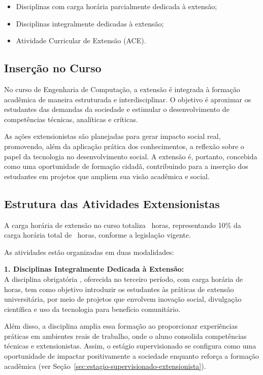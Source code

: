 \begin{itemize}
    \item Disciplinas com carga horária parcialmente dedicada à extensão;
    \item Disciplinas integralmente dedicadas à extensão;
    \item Atividade Curricular de Extensão (ACE).
\end{itemize}

\subsection{Inserção no Curso}

No curso de Engenharia de Computação, a extensão é integrada à formação acadêmica de maneira estruturada e interdisciplinar. O objetivo é aproximar os estudantes das demandas da sociedade e estimular o desenvolvimento de competências técnicas, analíticas e críticas.

As ações extensionistas são planejadas para gerar impacto social real, promovendo, além da aplicação prática dos conhecimentos, a reflexão sobre o papel da tecnologia no desenvolvimento social. A extensão é, portanto, concebida como uma oportunidade de formação cidadã, contribuindo para a inserção dos estudantes em projetos que ampliem sua visão acadêmica e social.

\subsection{Estrutura das Atividades Extensionistas}

A carga horária de extensão no curso totaliza \hExtensao\ horas, representando 10\% da carga horária total de \tHorasCurso\ horas, conforme a legislação vigente.

As atividades estão organizadas em duas modalidades:

\textbf{1. Disciplinas Integralmente Dedicada à Extensão:}\\
A disciplina obrigatória \textbf{\Ext}, oferecida no terceiro período, com carga horária de \ExtCH{ } horas, tem como objetivo introduzir os estudantes às práticas de extensão universitária, por meio de projetos que envolvem inovação social, divulgação científica e uso da tecnologia para benefício comunitário.

Além disso, a disciplina \textbf{\EstSup}{ } amplia essa formação ao proporcionar experiências práticas em ambientes reais de trabalho, onde o aluno consolida competências técnicas e extensionistas. Assim, o estágio supervisionado se configura como uma oportunidade de impactar positivamente a sociedade enquanto reforça a formação acadêmica (ver Seção~\ref{sec:estagio-supervisionado-extensionista}).


